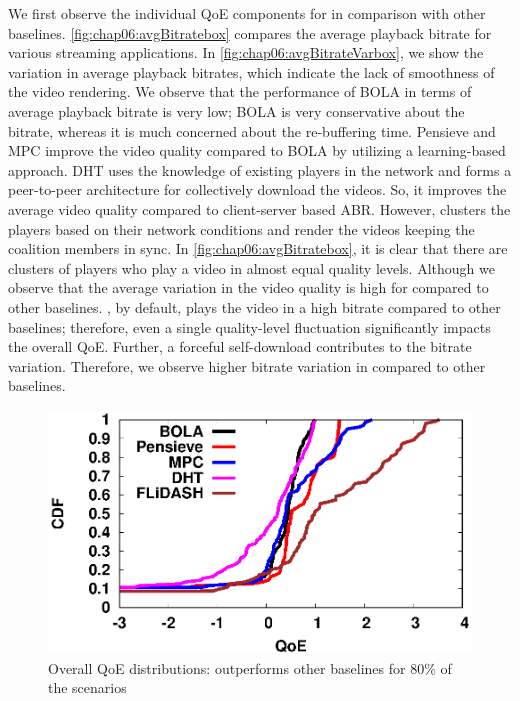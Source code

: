 We first observe the individual \ac{QoE} components for {\our} in comparison with other baselines. \fig\ref{fig:chap06:avgBitratebox} compares the average playback bitrate for various streaming applications. In \fig\ref{fig:chap06:avgBitrateVarbox}, we show the variation in average playback bitrates, which indicate the lack of smoothness of the video rendering. We observe that the performance of BOLA in terms of average playback bitrate is very low; BOLA is very conservative about the bitrate, whereas it is much concerned about the re-buffering time. Pensieve and MPC improve the video quality compared to BOLA by utilizing a learning-based approach. DHT uses the knowledge of existing players in the network and forms a peer-to-peer architecture for collectively download the videos. So, it improves the average video quality compared to client-server based \ac{ABR}. However, {\our} clusters the players based on their network conditions and render the videos keeping the coalition members in sync. In \fig\ref{fig:chap06:avgBitratebox}, it is clear that there are clusters of players who play a video in almost equal quality levels. Although we observe that the average variation in the video quality is high for {\our} compared to other baselines. {\our}, by default, plays the video in a high bitrate compared to other baselines; therefore, even a single quality-level fluctuation significantly impacts the overall \ac{QoE}. Further, a forceful self-download contributes to the bitrate variation. Therefore, we observe higher bitrate variation in {\our} compared to other baselines.  
\begin{figure}[!ht]
	\begin{center}
       			\includegraphics[width=0.7\linewidth]{img/grpbasic/qoe_cdf_1}
	\end{center}
	\caption{\label{fig:chap06:QoE} Overall QoE distributions: {\our} outperforms other baselines for $80\%$ of the scenarios}
\end{figure}


